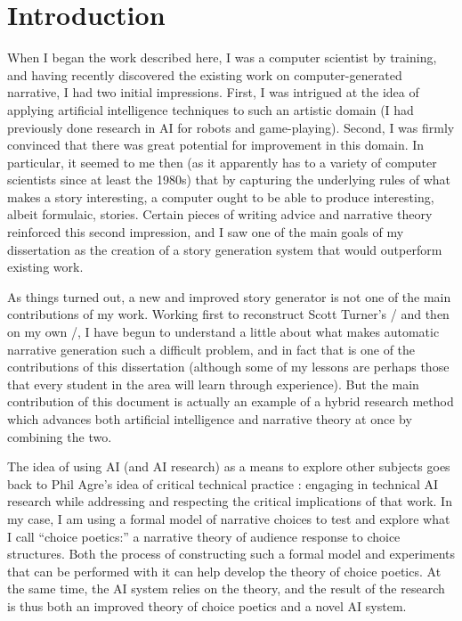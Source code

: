 \chapter{Introduction}

When I began the work described here, I was a computer scientist by training, and having recently discovered the existing work on computer-generated narrative, I had two initial impressions.
%
First, I was intrigued at the idea of applying artificial intelligence techniques to such an artistic domain (I had previously done research in AI for robots and game-playing).
%
Second, I was firmly convinced that there was great potential for improvement in this domain.
%
In particular, it seemed to me then (as it apparently has to a variety of computer scientists since at least the 1980s) that by capturing the underlying rules of what makes a story interesting, a computer ought to be able to produce interesting, albeit formulaic, stories.
%
Certain pieces of writing advice and narrative theory reinforced this second impression, and I saw one of the main goals of my dissertation as the creation of a story generation system that would outperform existing work.


As things turned out, a new and improved story generator is not one of the main contributions of my work.
%
Working first to reconstruct Scott Turner's \minstrel/ \cite{Turner1993} and then on my own \dunyazad/, I have begun to understand a little about what makes automatic narrative generation such a difficult problem, and in fact that is one of the contributions of this dissertation (although some of my lessons are perhaps those that every student in the area will learn through experience).
%
But the main contribution of this document is actually an example of a hybrid research method which advances both artificial intelligence and narrative theory at once by combining the two.


The idea of using AI (and AI research) as a means to explore other subjects goes back to Phil Agre's idea of critical technical practice \cite{Agre19XX}: engaging in technical AI research while addressing and respecting the critical implications of that work.
%
In my case, I am using a formal model of narrative choices to test and explore what I call ``choice poetics:'' a narrative theory of audience response to choice structures.
%
Both the process of constructing such a formal model and experiments that can be performed with it can help develop the theory of choice poetics.
%
At the same time, the AI system relies on the theory, and the result of the research is thus both an improved theory of choice poetics and a novel AI system.



